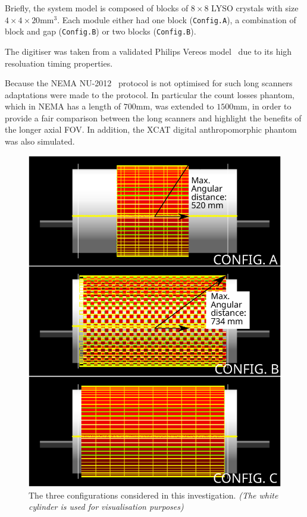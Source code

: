 \documentclass[journal]{IEEEtran}
\begin{document}
Briefly, the system model is composed of blocks of $8 \times 8$ LYSO crystals with size $4 \times 4 \times 20$mm$^3$.  Each module either had one block (\texttt{Config.A}), a combination of block and gap (\texttt{Config.B}) or two blocks (\texttt{Config.B}).

The digitiser was taken from a validated Philips Vereos model~\cite{Rausch2019PerformanceStandard} due to its high resoluation timing properties. 

Because the NEMA NU-2012~\cite{NationalElectricalManufacturersAssociation2012Performance2-2012} protocol is not optimised for such long scanners adaptations were made to the protocol. In particular the count losses phantom, which in NEMA has a length of $700$mm, was extended to $1500$mm, in order to provide a fair comparison between the long scanners and highlight the benefits of the longer axial FOV. In addition, the XCAT digital anthropomorphic phantom~\cite{Segars20104DResearch} was also simulated.

\begin{figure}
    \centering
    \includegraphics[width=0.9\linewidth]{dfd.png}
    \caption{The three configurations considered in this investigation. \textit{(The white cylinder is used for visualisation purposes)}}
    \label{fig:configs}
\end{figure}
\end{document}
